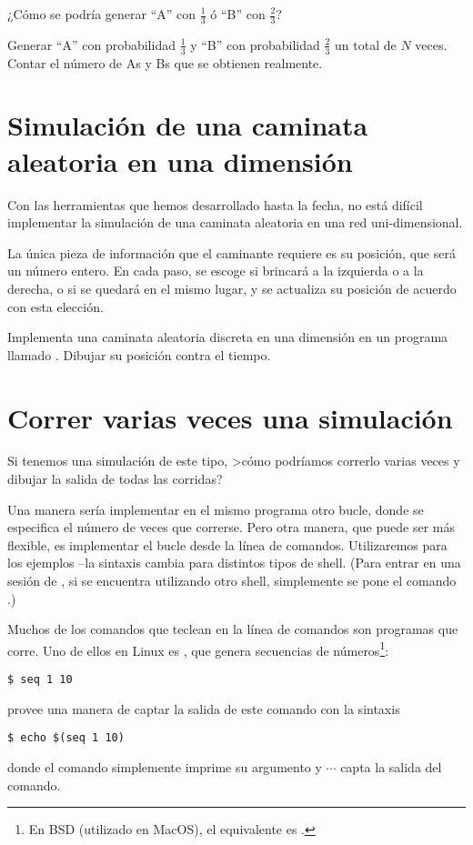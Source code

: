 \ejercicio
¿Cómo se podría generar ``A'' con $\frac{1}{3}$ ó ``B'' con
$\frac{2}{3}$?

\ejercicio
Generar ``A'' con probabilidad $\frac{1}{3}$ y  ``B'' con
probabilidad $\frac{2}{3}$ un total de $N$ veces. Contar el número de As y Bs
que se  obtienen realmente.


\section{Simulación de una caminata aleatoria en una dimensión}

Con las herramientas que hemos desarrollado hasta la fecha, no está difícil
implementar la simulación de una caminata aleatoria en una red uni-dimensional.

La única pieza de información que el caminante requiere es su posición, que
será un número entero.  En cada paso, se escoge si brincará a la izquierda o a
la derecha, o si se quedará en el mismo lugar, y se actualiza su posición de
acuerdo con esta elección.

\ejercicio 
Implementa una caminata aleatoria discreta en una dimensión en un programa
llamado .
Dibujar su posición contra el tiempo.

\section{Correr varias veces una simulación}
Si tenemos una simulación de este tipo, >cómo podríamos correrlo varias veces y
dibujar la salida de todas las corridas? 

Una manera sería implementar en el mismo programa otro bucle, donde se
especifica el número de veces que correrse. Pero otra manera, que puede ser más
flexible, es implementar el bucle desde la línea de comandos. Utilizaremos
 para los ejemplos --la sintaxis cambia para distintos tipos de
shell. (Para entrar en una sesión de , si se encuentra utilizando
otro shell, simplemente se pone el comando .)

Muchos de los comandos que teclean en la línea de comandos son programas que 
 corre. Uno de ellos en Linux es , que genera
secuencias de números\footnote{En BSD (utilizado en MacOS), el equivalente es
.}:
\begin{lstlisting}
$ seq 1 10
\end{lstlisting}
 provee una manera de captar la salida de este comando con la
sintaxis
\begin{lstlisting}
$ echo $(seq 1 10)
\end{lstlisting}
donde el comando  simplemente imprime su argumento y
\inl{$(} $\cdots$ \inl{)} capta la salida del comando.

